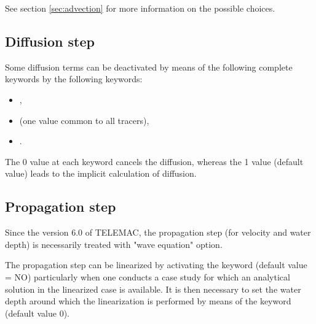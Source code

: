 See section \ref{sec:advection} for more information on the possible choices.

\subsection{Diffusion step}
\label{sec:difstep}

Some diffusion terms can be deactivated by means of the following complete
keywords by the following keywords:

\begin{itemize}
\item {},

\item {} (one value common to all tracers),

\item {}.
\end{itemize}

The 0 value at each keyword cancels the diffusion, whereas the 1 value
(default value) leads to the implicit calculation of diffusion.



\subsection{Propagation step}


Since the version 6.0 of TELEMAC, the propagation step (for velocity and water
depth) is necessarily treated with  "wave equation" option.

The propagation step can be linearized by activating the keyword
 (default value = NO) particularly when one
conducts a case study for which an analytical solution in the linearized case
is available. It is then necessary to set the water depth around which the
linearization is performed by means of the keyword  (default value 0).

